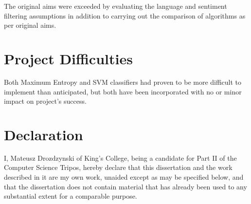 The original aims were exceeded by evaluating the language and sentiment filtering assumptions in addition to carrying out the comparison of algorithms as per original aims.

\section*{Project Difficulties}

Both Maximum Entropy and SVM classifiers had proven to be more difficult to implement than anticipated, but both have been incorporated with no or minor impact on project's success.

\newpage

\section*{Declaration}

I, Mateusz Drozdzynski of King's College, being a candidate for Part II of the Computer
Science Tripos, hereby declare
that this dissertation and the work described in it are my own work,
unaided except as may be specified below, and that the dissertation
does not contain material that has already been used to any substantial
extent for a comparable purpose.

\bigskip
{}

\medskip
{}

\cleardoublepage

\tableofcontents

\listoffigures

\listoftables

\cleardoublepage

\setcounter{page}{1}
\pagestyle{headings}